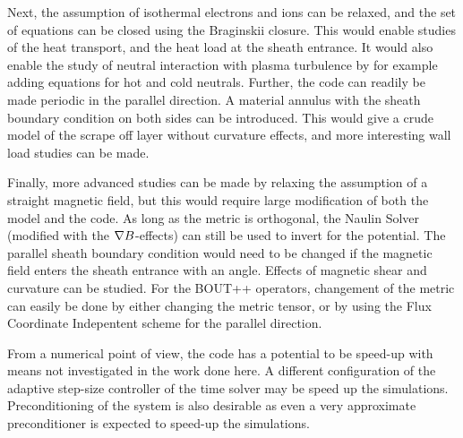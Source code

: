 Next, the assumption of isothermal electrons and ions can be relaxed, and the set of equations can be closed using the Braginskii closure.
This would enable studies of the heat transport, and the heat load at the sheath entrance.
It would also enable the study of neutral interaction with plasma turbulence by for example adding equations for hot and cold neutrals.
Further, the code can readily be made periodic in the parallel direction.
A material annulus with the sheath boundary condition on both sides can be introduced.
This would give a crude model of the scrape off layer without curvature effects, and more interesting wall load studies can be made.

Finally, more advanced studies can be made by relaxing the assumption of a straight magnetic field, but this would require large modification of both the model and the code.
As long as the metric is orthogonal, the Naulin Solver (modified with the $\nabla B$-effects) can still be used to invert for the potential.
The parallel sheath boundary condition would need to be changed if the magnetic field enters the sheath entrance with an angle.
Effects of magnetic shear and curvature can be studied.
For the BOUT++ operators, changement of the metric can easily be done by either changing the metric tensor, or by using the Flux Coordinate Indepentent scheme for the parallel direction.

From a numerical point of view, the code has a potential to be speed-up with means not investigated in the work done here.
A different configuration of the adaptive step-size controller of the time solver may be speed up the simulations.
Preconditioning of the system is also desirable as even a very approximate preconditioner is expected to speed-up the simulations.
